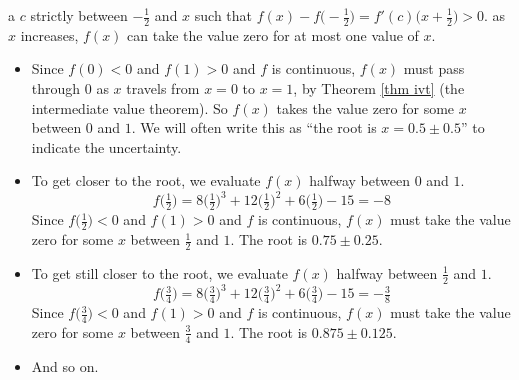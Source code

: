 \begin{eg}
{a $c$ strictly between $-\frac{1}{2}$ and $x$ such that
$f(x)-f\big(-\frac{1}{2}\big) = f'(c)\big(x+\frac{1}{2}\big)>0$.} as 
$x$ increases, $f(x)$ can take the value zero for at most one value of $x$.
\begin{itemize}\itemsep1pt \parskip0pt 
\item
Since $f(0)<0$ and $f(1)>0$ and $f$ is continuous, $f(x)$ must
pass through $0$ as $x$ travels from $x=0$ to $x=1$, by Theorem 
\ref{thm ivt} (the intermediate value theorem). So $f(x)$ takes the value zero 
for some $x$ between $0$ and $1$. We will often write this as  ``the root is 
$x=0.5\pm 0.5$'' to indicate the uncertainty. 
\item 
To get closer to the root, we evaluate $f(x)$ halfway between $0$ and $1$.
\begin{equation*}
f\big(\tfrac{1}{2}\big) = 8\big(\tfrac{1}{2}\big)^3+12\big(\tfrac{1}{2}\big)^2
                             +6\big(\tfrac{1}{2}\big)-15
                        = -8
\end{equation*}
Since $f\big(\frac{1}{2}\big)<0$ and $f(1)>0$ and $f$ is continuous, 
$f(x)$ must take the value zero for some $x$ 
between $\frac{1}{2}$ and $1$. The root is $0.75\pm 0.25$.

\item 
To get still closer to the root, we evaluate $f(x)$ halfway between 
$\frac{1}{2}$ and $1$.
\begin{equation*}
f\big(\tfrac{3}{4}\big) = 8\big(\tfrac{3}{4}\big)^3+12\big(\tfrac{3}{4}\big)^2
                             +6\big(\tfrac{3}{4}\big)-15
                        = -\tfrac{3}{8}
\end{equation*}
Since $f\big(\frac{3}{4}\big)<0$ and $f(1)>0$ and $f$ is continuous, 
$f(x)$ must take the value zero for some $x$ 
between $\frac{3}{4}$ and $1$. The root is $0.875\pm 0.125$.
\item And so on.
\end{itemize}
\end{eg}

